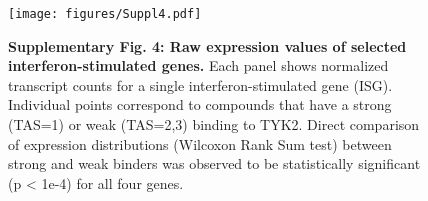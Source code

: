 \documentclass{article}
\begin{document}

\begin{figure}
  \begin{center}
    \texttt{[image: figures/Suppl4.pdf]}
  \end{center}
  \caption*{\textbf{Supplementary Fig. 4: Raw expression values of selected interferon-stimulated genes.} Each panel shows normalized transcript counts for a single interferon-stimulated gene (ISG). Individual points correspond to compounds that have a strong (TAS=1) or weak (TAS=2,3) binding to TYK2. Direct comparison of expression distributions (Wilcoxon Rank Sum test) between strong and weak binders was observed to be statistically significant (p < 1e-4) for all four genes.}
\end{figure}
\end{document}
